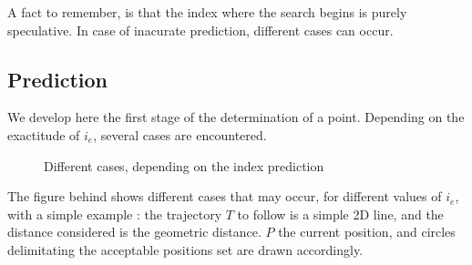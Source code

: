 A fact to remember, is that the index where the search begins is purely speculative. In case of inacurate 
prediction, different cases can occur.

\newpage

\subsection{Prediction}

We develop here the first stage of the determination of a point. Depending on the exactitude of $i_e$, several
cases are encountered.

\begin{figure}[!h]
\caption{Different cases, depending on the index prediction}
\end{figure}

The figure behind shows different cases that may occur, for different values of $i_e$, with a simple example :
the trajectory $T$ to follow is a simple 2D line, and the distance considered is the geometric distance.
$P$ the current position, and circles delimitating the acceptable positions set are drawn accordingly.

